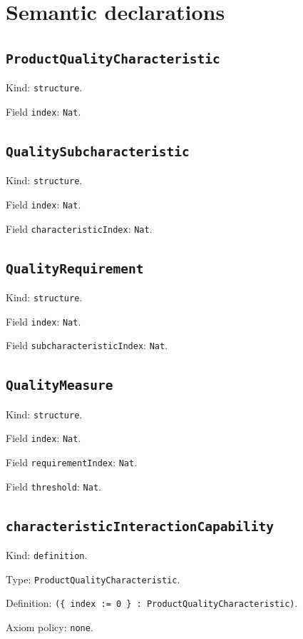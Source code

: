 \documentclass[11pt]{article}
\begin{document}
\section*{Semantic declarations}
\subsection*{\texttt{ProductQualityCharacteristic}}
\noindent Kind: \texttt{structure}.\par
\noindent Field \texttt{index}: \texttt{Nat}.\par
\subsection*{\texttt{QualitySubcharacteristic}}
\noindent Kind: \texttt{structure}.\par
\noindent Field \texttt{index}: \texttt{Nat}.\par
\noindent Field \texttt{characteristicIndex}: \texttt{Nat}.\par
\subsection*{\texttt{QualityRequirement}}
\noindent Kind: \texttt{structure}.\par
\noindent Field \texttt{index}: \texttt{Nat}.\par
\noindent Field \texttt{subcharacteristicIndex}: \texttt{Nat}.\par
\subsection*{\texttt{QualityMeasure}}
\noindent Kind: \texttt{structure}.\par
\noindent Field \texttt{index}: \texttt{Nat}.\par
\noindent Field \texttt{requirementIndex}: \texttt{Nat}.\par
\noindent Field \texttt{threshold}: \texttt{Nat}.\par
\subsection*{\texttt{characteristicInteractionCapability}}
\noindent Kind: \texttt{definition}.\par
\noindent Type: \texttt{ProductQualityCharacteristic}.\par
\noindent Definition: \texttt{(\{ index := 0 \} : ProductQualityCharacteristic)}.\par
\noindent Axiom policy: \texttt{none}.\par
\end{document}
